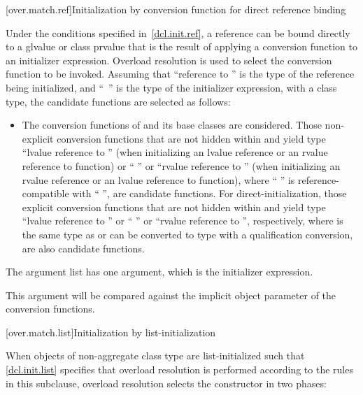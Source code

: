 [over.match.ref]{Initialization by conversion function for direct reference binding}%

\pnum
Under the conditions specified in~\ref{dcl.init.ref}, a reference can be bound directly
to a glvalue or class prvalue that is the result of applying a conversion
function to an initializer expression.
Overload resolution is used to select the
conversion function to be invoked.
Assuming that ``reference to  '' is the
type of the reference being initialized, and
``\cv{}~'' is the type
of the initializer expression, with
a class type,
the candidate functions are selected as follows:
\begin{itemize}
\item
The conversion functions of
and its base classes are considered.
Those non-explicit conversion functions that are not hidden within
and yield type ``lvalue reference to  ''
(when initializing an lvalue reference or an rvalue reference to function) or
`` ''
or ``rvalue reference to  '' (when initializing an
rvalue reference or an lvalue reference to function),
where `` '' is reference-compatible
with `` '',
are candidate functions. For direct-initialization, those explicit
conversion functions that are not hidden within  and yield
type ``lvalue reference to  '' or ``
'' or ``rvalue reference to  '',
respectively, where  is the same type as  or can be
converted to type  with a qualification
conversion, are also candidate functions.

\end{itemize}

\pnum
The argument list has one argument, which is the initializer expression.
\begin{note}
This argument will be compared against
the implicit object parameter of the conversion functions.
\end{note}

[over.match.list]{Initialization by list-initialization}%

\pnum
When objects of non-aggregate class type  are
list-initialized such that \ref{dcl.init.list} specifies that overload resolution
is performed according to the rules in this subclause, overload resolution selects the
constructor in two phases:

